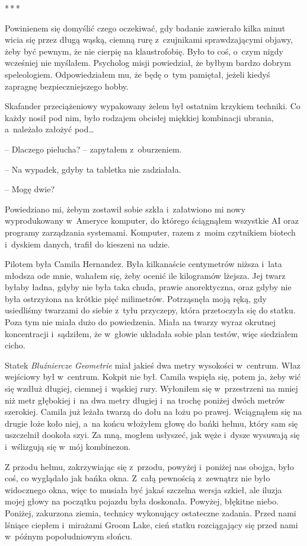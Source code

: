 \documentclass[oneside,polish,12pt,sfheadings]{mwbk}
\newcommand{\threeast}{\bigskip\par\centerline{*\,*\,*}\medskip\par}%
\begin{document}
\threeast

Powinienem się domyślić czego oczekiwać, gdy badanie zawierało kilka
minut wicia się przez długą wąską, ciemną rurę z~czujnikami
sprawdzającymi objawy, żeby być pewnym, że nie cierpię na klaustrofobię.
Było to coś, o~czym nigdy wcześniej nie myślałem. Psycholog misji
powiedział, że byłbym bardzo dobrym speleologiem. Odpowiedziałem mu, że
będę o~tym pamiętał, jeżeli kiedyś zapragnę bezpieczniejszego hobby.

Skafander przeciążeniowy wypakowany żelem był ostatnim krzykiem
techniki. Co każdy nosił pod nim, było rodzajem obcisłej miękkiej
kombinacji ubrania, a~należało założyć pod\ldots

-- Dlaczego pielucha? -- zapytałem z~oburzeniem.

-- Na wypadek, gdyby ta tabletka nie zadziałała.

-- Mogę dwie?

Powiedziano mi, żebym zostawił sobie szkła i~załatwiono mi nowy
wyprodukowany w~Ameryce komputer, do którego ściągnąłem wszystkie AI
oraz programy zarządzania systemami. Komputer, razem z~moim czytnikiem
biotech i~dyskiem danych, trafił do kieszeni na udzie.

Pilotem była Camila Hernandez. Była kilkanaście centymetrów niższa i~lata młodsza ode mnie, wahałem się, żeby ocenić ile kilogramów lżejsza.
Jej twarz byłaby ładna, gdyby nie była taka chuda, prawie anorektyczna,
oraz gdyby nie była ostrzyżona na krótkie pięć milimetrów. Potrząsnęła
moją ręką, gdy usiedliśmy twarzami do siebie z~tyłu przyczepy, która
przetoczyła się do statku. Poza tym nie miała dużo do powiedzenia. Miała
na twarzy wyraz okrutnej koncentracji i~sądziłem, że w~głowie układała
sobie plan testów, więc siedziałem cicho.

Statek \emph{Bluźniercze Geometrie} miał jakieś dwa metry wysokości w~centrum. Właz wejściowy był w~centrum. Kokpit nie był. Camila wspięła
się, potem ja, żeby wić się wzdłuż długiej, ciemnej i~wąskiej rury.
Wyłoniłem się w~przestrzeni na mniej niż metr głębokiej i~na dwa metry
długiej i~na trochę poniżej dwóch metrów szerokiej. Camila już leżała
twarzą do dołu na łożu po prawej. Wciągnąłem się na drugie łoże koło
niej, a~na końcu włożyłem głowę do bańki hełmu, który sam się uszczelnił
dookoła szyi. Za mną, mogłem usłyszeć, jak węże i~dysze wysuwają się i~wślizgują się w~mój kombinezon.

Z przodu hełmu, zakrzywiając się z~przodu, powyżej i~poniżej nas obojga,
było coś, co wyglądało jak bańka okna. Z~całą pewnością z~zewnątrz nie
było widocznego okna, więc to musiała być jakaś szczelna wersja szkieł,
ale iluzja mojej głowy na początku pojazdu była doskonała. Powyżej,
błękitne niebo. Poniżej, zakurzona ziemia, technicy wykonujący
ostateczne zadania. Przed nami lśniące ciepłem i~mirażami Groom Lake,
cień statku rozciągający się przed nami w~późnym popołudniowym słońcu.
\end{document}

